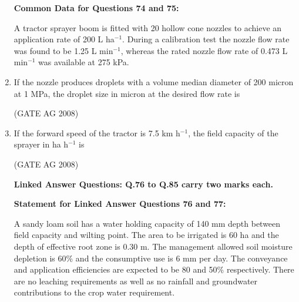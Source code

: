 \documentclass[journal,12pt,onecolumn]{IEEEtran}
\begin{document}
\begin{enumerate}
\medskip


\textbf{Common Data for Questions 74 and 75:}

A tractor sprayer boom is fitted with 20 hollow cone nozzles to achieve an application rate of 200 L ha$^{-1}$. During a calibration test the nozzle flow rate was found to be 1.25 L min$^{-1}$, whereas the rated nozzle flow rate of 0.473 L min$^{-1}$ was available at 275 kPa.

\item 
 If the nozzle produces droplets with a volume median diameter of 200 micron at 1 MPa, the droplet size in micron at the desired flow rate is
\begin{enumerate}
\end{enumerate}
\hfill(GATE AG 2008)\\

\medskip

\item 
 If the forward speed of the tractor is 7.5 km h$^{-1}$, the field capacity of the sprayer in ha h$^{-1}$ is
\begin{enumerate}
\end{enumerate}
\hfill(GATE AG 2008)\\

\medskip


\textbf{Linked Answer Questions: Q.76 to Q.85 carry two marks each.}

\textbf{Statement for Linked Answer Questions 76 and 77:}

A sandy loam soil has a water holding capacity of 140 mm depth between field capacity and wilting point. The area to be irrigated is 60 ha and the depth of effective root zone is 0.30 m. The management allowed soil moisture depletion is 60\% and the consumptive use is 6 mm per day. The conveyance and application efficiencies are expected to be 80 and 50\% respectively. There are no leaching requirements as well as no rainfall and groundwater contributions to the crop water requirement.


\end{enumerate}
\end{document}
